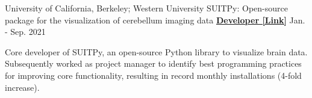 
\begin{cventries}
    
  \cventry
    {University of California, Berkeley; Western University} %
  	{SUITPy: Open-source package for the visualization of cerebellum imaging data} %
  	{\href{https://suitpy.readthedocs.io/en/latest/}{\textbf{Developer [Link]}}}
  	{Jan. - Sep. 2021}
    {
      \begin{cvitems} %
      	\item {Core developer of SUITPy, an open-source Python library to visualize brain data. Subsequently worked as project manager to identify best programming practices for improving core functionality, resulting in record monthly installations (4-fold increase).}
      \end{cvitems}
    }
    
    


\end{cventries}
